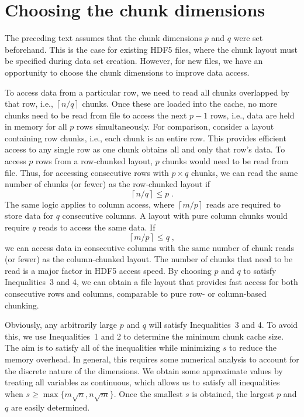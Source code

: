 \documentclass{article}
\providecommand{\myceil}[1]{\left \lceil #1 \right \rceil }
\begin{document}

\section{Choosing the chunk dimensions}
The preceding text assumes that the chunk dimensions $p$ and $q$ were set beforehand.
This is the case for existing HDF5 files, where the chunk layout must be specified during data set creation.
However, for new files, we have an opportunity to choose the chunk dimensions to improve data access.

To access data from a particular row, we need to read all chunks overlapped by that row, i.e., $\myceil{n/q}$ chunks.
Once these are loaded into the cache, no more chunks need to be read from file to access the next $p-1$ rows, i.e., data are held in memory for all $p$ rows simultaneously.
For comparison, consider a layout containing row chunks, i.e., each chunk is an entire row.
This provides efficient access to any single row as one chunk obtains all and only that row's data.
To access $p$ rows from a row-chunked layout, $p$ chunks would need to be read from file.
Thus, for accessing consecutive rows with $p \times q$ chunks, we can read the same number of chunks (or fewer) as the row-chunked layout if 
\begin{equation}
\myceil{n/q} \le p \;.
\end{equation}
The same logic applies to column access, where $\myceil{m/p}$ reads are required to store data for $q$ consecutive columns.
A layout with pure column chunks would require $q$ reads to access the same data.
If 
\begin{equation}
\myceil{m/p} \le q \;,
\end{equation}
we can access data in consecutive columns with the same number of chunk reads (or fewer) as the column-chunked layout. 
The number of chunks that need to be read is a major factor in HDF5 access speed.
By choosing $p$ and $q$ to satisfy Inequalities~3 and 4, we can obtain a file layout that provides fast access for both consecutive rows and columns, comparable to pure row- or column-based chunking.

Obviously, any arbitrarily large $p$ and $q$ will satisfy Inequalities~3 and 4.
To avoid this, we use Inequalities~1 and 2 to determine the minimum chunk cache size.
The aim is to satisfy all of the inequalities while minimizing $s$ to reduce the memory overhead.
In general, this requires some numerical analysis to account for the discrete nature of the dimensions.
We obtain some approximate values by treating all variables as continuous, which allows us to satisfy all inequalities when $s \ge \max\{m\sqrt{n}, n\sqrt{m}\}$.
Once the smallest $s$ is obtained, the largest $p$ and $q$ are easily determined.
\end{document}
